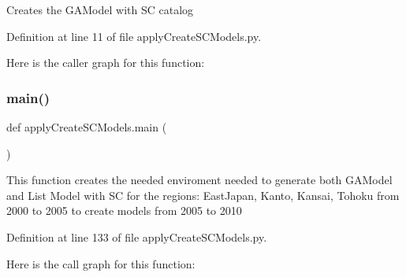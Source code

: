 \begin{DoxyVerb}Creates the GAModel with SC catalog
\end{DoxyVerb}
 

Definition at line 11 of file apply\+Create\+S\+C\+Models.\+py.

Here is the caller graph for this function\+:
\mbox{\label{namespaceapply_create_s_c_models_a320e2283a254f21845fa4b6af7a65e68}} 
\subsubsection{\texorpdfstring{main()}{main()}}
{\footnotesize\ttfamily def apply\+Create\+S\+C\+Models.\+main (\begin{DoxyParamCaption}{ }\end{DoxyParamCaption})}

\begin{DoxyVerb}This function creates the needed enviroment needed to generate both GAModel and List Model with SC
for the regions: EastJapan, Kanto, Kansai, Tohoku
from 2000 to 2005 to create models from 2005 to 2010
\end{DoxyVerb}
 

Definition at line 133 of file apply\+Create\+S\+C\+Models.\+py.

Here is the call graph for this function\+:
